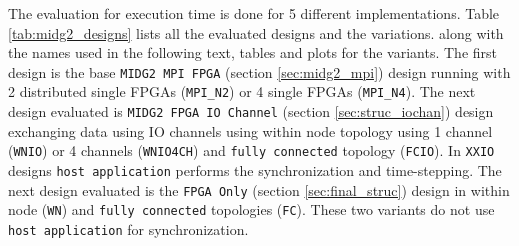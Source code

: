 The evaluation for execution time is done for 5 different implementations.
Table \ref{tab:midg2_designs} lists all the evaluated designs and the variations.
along with the names used in the following text, tables and plots for the variants.
The first design is the base \texttt{MIDG2 MPI FPGA} (section \ref{sec:midg2_mpi}) design running with
2 distributed single FPGAs (\texttt{MPI\_N2}) or 4 single FPGAs (\texttt{MPI\_N4}).
The next design evaluated is \texttt{MIDG2 FPGA IO Channel} (section \ref{sec:struc_iochan})
design exchanging data using IO channels using within node topology using 1 channel (\texttt{WNIO})
or 4 channels (\texttt{WNIO4CH}) and \texttt{fully connected} topology (\texttt{FCIO}). In \texttt{XXIO} designs
\texttt{host application} performs the synchronization and time-stepping.
The next design evaluated is the \texttt{FPGA Only} (section \ref{sec:final_struc}) design in
within node (\texttt{WN}) and \texttt{fully connected} topologies (\texttt{FC}). These two variants do not use
\texttt{host application} for synchronization.

